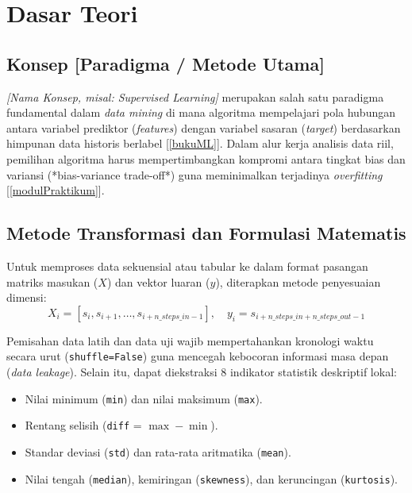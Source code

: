 \documentclass[a4paper,oneside,11pt]{book}
\begin{document}
\chapter{Dasar Teori}
\label{chap:dasarteori}

\section{Konsep [Paradigma / Metode Utama]}
\textit{[Nama Konsep, misal: Supervised Learning]} merupakan salah satu paradigma fundamental dalam \textit{data mining} di mana algoritma mempelajari pola hubungan antara variabel prediktor (\textit{features}) dengan variabel sasaran (\textit{target}) berdasarkan himpunan data historis berlabel [\ref{bukuML}]. Dalam alur kerja analisis data riil, pemilihan algoritma harus mempertimbangkan kompromi antara tingkat bias dan variansi (*bias-variance trade-off*) guna meminimalkan terjadinya \textit{overfitting} [\ref{modulPraktikum}].

\section{Metode Transformasi dan Formulasi Matematis}
Untuk memproses data sekuensial atau tabular ke dalam format pasangan matriks masukan ($X$) dan vektor luaran ($y$), diterapkan metode penyesuaian dimensi:
\begin{equation}
    X_i = [s_i, s_{i+1}, \dots, s_{i+n\_steps\_in-1}], \quad y_i = s_{i+n\_steps\_in+n\_steps\_out-1}
    \label{eq:transformasi}
\end{equation}

Pemisahan data latih dan data uji wajib mempertahankan kronologi waktu secara urut (\texttt{shuffle=False}) guna mencegah kebocoran informasi masa depan (\textit{data leakage}). Selain itu, dapat diekstraksi 8 indikator statistik deskriptif lokal:
\begin{itemize}
    \item Nilai minimum (\texttt{min}) dan nilai maksimum (\texttt{max}).
    \item Rentang selisih (\texttt{diff} = $\max - \min$).
    \item Standar deviasi (\texttt{std}) dan rata-rata aritmatika (\texttt{mean}).
    \item Nilai tengah (\texttt{median}), kemiringan (\texttt{skewness}), dan keruncingan (\texttt{kurtosis}).
\end{itemize}
\end{document}

